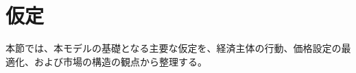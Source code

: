 
\section{仮定}
\label{sec:chapter3_assumptions}
本節では、本モデルの基礎となる主要な仮定を、経済主体の行動、価格設定の最適化、および市場の構造の観点から整理する。








